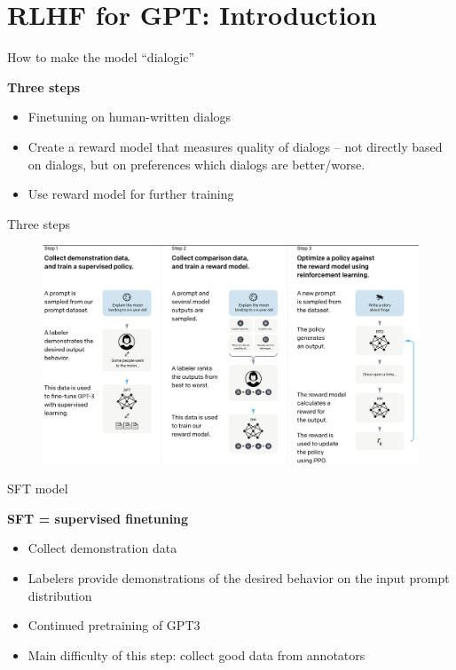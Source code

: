 


\section{RLHF for GPT: Introduction}


\begin{vbframe}{How to make the model ``dialogic''}

\vfill

\textbf{Three steps}

	\begin{itemize}
		\item Finetuning on human-written dialogs
                \item Create a reward model that measures
		quality of dialogs -- not directly based on dialogs,
		but on preferences which dialogs are
		better/worse.
                \item Use reward model for further training
	\end{itemize}

\vfill

\end{vbframe}


\begin{vbframe}{Three steps}


\begin{figure}
\centering
\includegraphics[width = 12cm]{figure/threesteps.png}
\end{figure}


\end{vbframe}

\begin{vbframe}{SFT model}

\vfill

\textbf{SFT = supervised finetuning}

	\begin{itemize}
	\item Collect demonstration data
        \item Labelers provide demonstrations of the
          desired behavior on the input prompt distribution
\item Continued pretraining of GPT3
\item Main difficulty of this step: collect good data from annotators                  
	\end{itemize}

\vfill

\end{vbframe}

